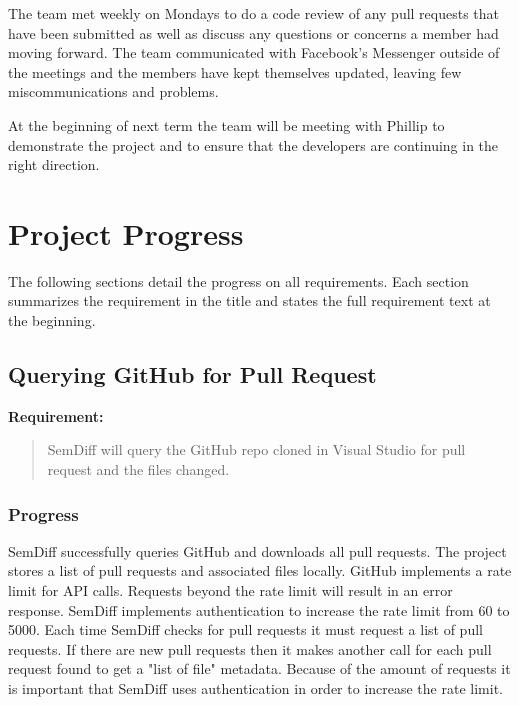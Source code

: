 \documentclass[draftclsnofoot,onecolumn]{IEEEtran}
\begin{document}
The team met weekly on Mondays to do a code review of any pull requests that 
have been submitted as well as discuss any questions or concerns a member had 
moving forward. The team communicated with Facebook's Messenger outside of the 
meetings and the members have kept themselves updated, leaving few 
miscommunications and problems.

At the beginning of next term the team will be meeting with Phillip to 
demonstrate the project and to ensure that the developers are continuing in the 
right direction.

\section{Project Progress}%

The following sections detail the progress on all requirements. Each section 
summarizes the requirement in the title and states the full requirement text at 
the beginning.

\subsection{Querying GitHub for Pull Request}%

\textbf{Requirement:}

\begin{quote}

SemDiff will query the GitHub repo cloned in Visual Studio for pull request 
and the files changed.

\end{quote}

\subsubsection{Progress}

SemDiff successfully queries GitHub and downloads all pull requests. The 
project stores a list of pull requests and associated files locally. GitHub 
implements a rate limit for API calls. Requests beyond the rate limit will 
result in an error response. SemDiff implements authentication to increase the 
rate limit from 60 to 5000. Each time SemDiff checks for pull requests it must request a list of pull requests. If there are new pull requests then it makes another call for each pull request found to get a "list of file" metadata. Because of the amount of requests it is important that SemDiff uses authentication in order to increase the rate limit.
\end{document}
